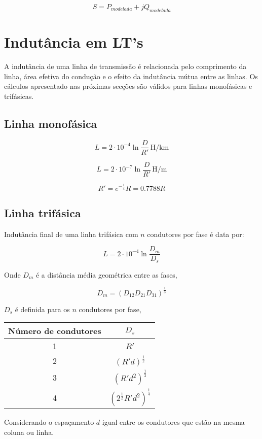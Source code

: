 \documentclass[ 10pt, twocolumn]{article}
\newcommand{\unit}[1]{\ensuremath{\, \mathrm{#1}}}
\begin{document}
\begin{equation}
S = P_{modelada} + jQ_{modelada}  
\end{equation}

\section{Indutância em LT's}

A indutância de uma linha de transmissão é relacionada pelo
comprimento da linha, área efetiva do condução e o efeito da 
indutância mútua entre as linhas. Os cálculos apresentado nas
próximas secções são válidos para linhas monofásicas e trifásicas. 

\subsection{Linha monofásica}

\begin{equation}
L = 2 \cdot 10^{-4} \ln\frac{D}{R'} \unit{H/km}
\end{equation}
    
\begin{equation}
L = 2 \cdot 10^{-7} \ln\frac{D}{R'} \unit{H/m}
\end{equation}

\begin{equation}
R' = e^{-\frac{1}{4}}R = 0.7788R
\end{equation}

\subsection{Linha trifásica}
Indutância final de uma linha trifásica com $n$ condutores por fase é data por:

\begin{equation}
L = 2 \cdot 10^{-4} \ln\frac{D_m}{D_s}
\end{equation}

Onde $D_m$ é a distância média geométrica entre as fases,

\begin{equation}
D_m = (D_{12} D_{21} D_{31})^{\frac{1}{3}}
\end{equation}

$D_s$ é definida para os $n$ condutores por fase,
\begin{center}
\begin{tabular}{|c||c|}
    \hline
    Número de condutores & $D_s$ \\
    \hline
    1 & $R'$ \\
    2 & $(R' d)^{\frac{1}{2}}$ \\
    3 & $(R' d^2)^{\frac{1}{3}}$ \\
    4 & $(2^{\frac{1}{2}} R' d^2)^{\frac{1}{4}}$ \\ 
    \hline
\end{tabular}
\end{center}

Considerando o espaçamento $d$ igual entre os condutores que estão na mesma coluna ou linha.
\end{document}
